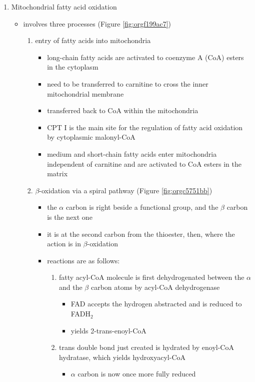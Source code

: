 \documentclass{scrartcl}
\begin{document}
\begin{enumerate}
\item Mitochondrial fatty acid oxidation
\label{sec:org807c416}

\begin{itemize}
\item involves three processes (Figure \ref{fig:orgf199ac7})
\begin{enumerate}
\item entry of fatty acids into mitochondria
\begin{itemize}
\item long-chain fatty acids are activated to coenzyme A (CoA) esters
in the cytoplasm
\item need to be transferred to carnitine to cross the inner
mitochondrial membrane
\item transferred back to CoA within the mitochondria
\item CPT I is the main site for the regulation of fatty acid
oxidation by cytoplasmic malonyl-CoA
\item medium and short-chain fatty acids enter mitochondria
independent of carnitine and are activated to CoA esters in the
matrix
\end{itemize}
\item \(\beta\)-oxidation via a spiral pathway (Figure \ref{fig:orgc5751bb})
\begin{itemize}
\item the \(\alpha\) carbon is right beside a functional group, and the
\(\beta\) carbon is the next one
\item it is at the second carbon from the thioester, then, where the
action is in \(\beta\)-oxidation
\item reactions are as follows:
\begin{enumerate}
\item fatty acyl-CoA molecule is first dehydrogenated between the \(\alpha\)
and the \(\beta\) carbon atoms by acyl-CoA dehydrogenase
\begin{itemize}
\item FAD accepts the hydrogen abstracted and is reduced to FADH\(_{\text{2}}\)
\item yields 2-trans-enoyl-CoA
\end{itemize}
\item trans double bond just created is hydrated by enoyl-CoA
hydratase, which yields hydroxyacyl-CoA
\begin{itemize}
\item \(\alpha\) carbon is now once more fully reduced

\end{itemize}
\end{enumerate}
\end{itemize}
\end{enumerate}
\end{itemize}
\end{enumerate}
\end{document}
